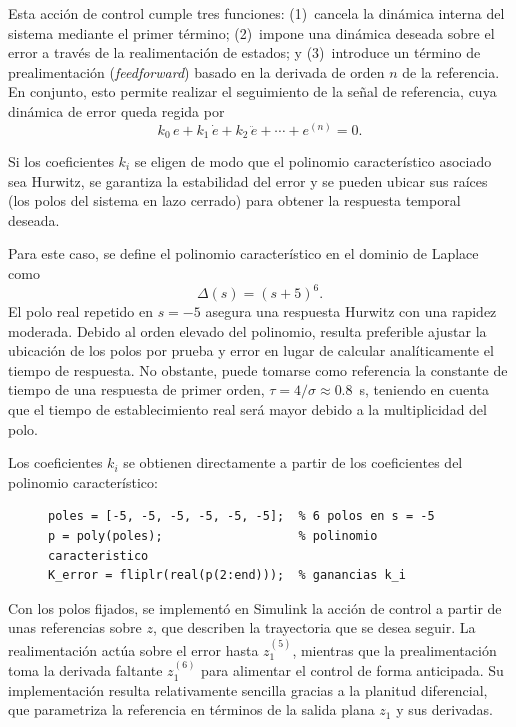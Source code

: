 \documentclass[conference]{IEEEtran}
\begin{document}
Esta acción de control cumple tres funciones: (1)~cancela la dinámica interna del sistema mediante el primer término; (2)~impone una dinámica deseada sobre el error a través de la realimentación de estados; y (3)~introduce un término de prealimentación (\textit{feedforward}) basado en la derivada de orden $n$ de la referencia. En conjunto, esto permite realizar el seguimiento de la señal de referencia, cuya dinámica de error queda regida por
\begin{equation}
	k_0\, e + k_1\, \dot{e} + k_2\, \ddot{e} + \cdots + e^{(n)} = 0.
\end{equation}

Si los coeficientes $k_i$ se eligen de modo que el polinomio característico asociado sea Hurwitz, se garantiza la estabilidad del error y se pueden ubicar sus raíces (los polos del sistema en lazo cerrado) para obtener la respuesta temporal deseada.

Para este caso, se define el polinomio característico en el dominio de Laplace como
\begin{equation}
	\Delta(s) = (s + 5)^6.
\end{equation}
El polo real repetido en $s=-5$ asegura una respuesta Hurwitz con una rapidez moderada. Debido al orden elevado del polinomio, resulta preferible ajustar la ubicación de los polos por prueba y error en lugar de calcular analíticamente el tiempo de respuesta. No obstante, puede tomarse como referencia la constante de tiempo de una respuesta de primer orden, $\tau = 4/\sigma \approx 0.8$~s, teniendo en cuenta que el tiempo de establecimiento real será mayor debido a la multiplicidad del polo.

Los coeficientes $k_i$ se obtienen directamente a partir de los coeficientes del polinomio característico:

\begin{figure}[H]
\lstset{style=matlabstyle}
\begin{lstlisting}[caption={Cálculo de las ganancias de realimentación a partir de la ubicación de polos deseada.}, label={lst:ganancias}]
poles = [-5, -5, -5, -5, -5, -5];  % 6 polos en s = -5
p = poly(poles);                   % polinomio caracteristico
K_error = fliplr(real(p(2:end)));  % ganancias k_i
\end{lstlisting}
\end{figure}

Con los polos fijados, se implementó en Simulink la acción de control a partir de unas referencias sobre $z$, que describen la trayectoria que se desea seguir. La realimentación actúa sobre el error hasta $z_1^{(5)}$, mientras que la prealimentación toma la derivada faltante $z_1^{(6)}$ para alimentar el control de forma anticipada. Su implementación resulta relativamente sencilla gracias a la planitud diferencial, que parametriza la referencia en términos de la salida plana $z_1$ y sus derivadas.
\end{document}
